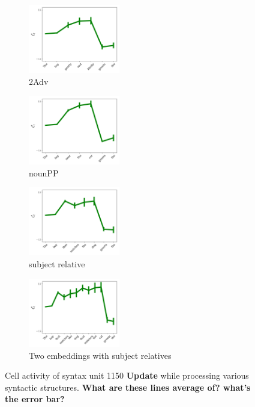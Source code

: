 \begin{figure}[t]
    \begin{subfigure}{0.49\textwidth}
            \centering
            \includegraphics[width=\linewidth, height=3cm]{Figures/adv_conjunction_1149_cell}
            \caption{2Adv}
            \label{fig:syntax-unit-2Adv}
    \end{subfigure}
    \begin{subfigure}{0.49\textwidth}
            \centering
            \includegraphics[width=\linewidth, height=3cm]{Figures/nounpp_1149_cell.png}
            \caption{nounPP}
            \label{fig:syntax-unit-nounpp}
    \end{subfigure}
    \begin{subfigure}{0.49\textwidth}
            \centering
            \includegraphics[width=\linewidth, height=3cm]{Figures/subjrel_that_1149_cell.png}
            \caption{subject relative}
            \label{fig:syntax-unit-subjrel}
    \end{subfigure}
    \begin{subfigure}{0.49\textwidth}
            \centering
            \includegraphics[width=\linewidth, height=3cm]{Figures/double_subjrel_that_1149_cell.png}
            \caption{Two embeddings with subject relatives}
            \label{fig:syntax-unit-double-subjrel}
    \end{subfigure}
\caption{Cell activity of syntax unit 1150 \textbf{Update} while processing various syntactic structures. \textbf{What are these lines average of? what's the error bar?}}
\end{figure}

